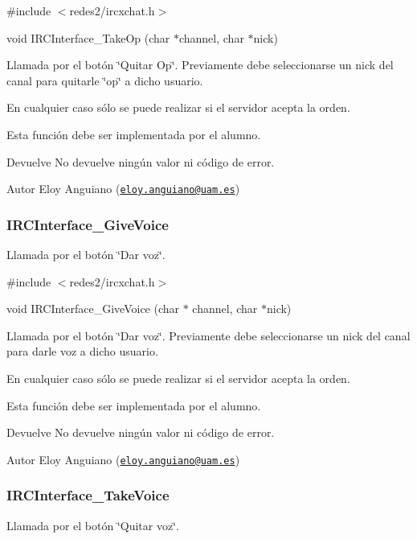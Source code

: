 \#include $<$redes2/ircxchat.\-h$>$

void I\-R\-C\-Interface\-\_\-\-Take\-Op (char $\ast$channel, char $\ast$nick)

Llamada por el botón \char`\"{}\-Quitar Op\char`\"{}. Previamente debe seleccionarse un nick del canal para quitarle \char`\"{}op\char`\"{} a dicho usuario.

En cualquier caso sólo se puede realizar si el servidor acepta la orden.

Esta función debe ser implementada por el alumno.

\begin{DoxyReturn}{Devuelve}
No devuelve ningún valor ni código de error.
\end{DoxyReturn}
\begin{DoxyAuthor}{Autor}
Eloy Anguiano (\href{mailto:eloy.anguiano@uam.es}{\tt eloy.\-anguiano@uam.\-es})
\end{DoxyAuthor}


 \hypertarget{IRCInterface_GiveVoice}{}\subsubsection{I\-R\-C\-Interface\-\_\-\-Give\-Voice}\label{IRCInterface_GiveVoice}
Llamada por el botón \char`\"{}\-Dar voz\char`\"{}.

\#include $<$redes2/ircxchat.\-h$>$

void I\-R\-C\-Interface\-\_\-\-Give\-Voice (char $\ast$ channel, char $\ast$nick)

Llamada por el botón \char`\"{}\-Dar voz\char`\"{}. Previamente debe seleccionarse un nick del canal para darle voz a dicho usuario.

En cualquier caso sólo se puede realizar si el servidor acepta la orden.

Esta función debe ser implementada por el alumno.

\begin{DoxyReturn}{Devuelve}
No devuelve ningún valor ni código de error.
\end{DoxyReturn}
\begin{DoxyAuthor}{Autor}
Eloy Anguiano (\href{mailto:eloy.anguiano@uam.es}{\tt eloy.\-anguiano@uam.\-es})
\end{DoxyAuthor}


 \hypertarget{IRCInterface_TakeVoice}{}\subsubsection{I\-R\-C\-Interface\-\_\-\-Take\-Voice}\label{IRCInterface_TakeVoice}
Llamada por el botón \char`\"{}\-Quitar voz\char`\"{}.

